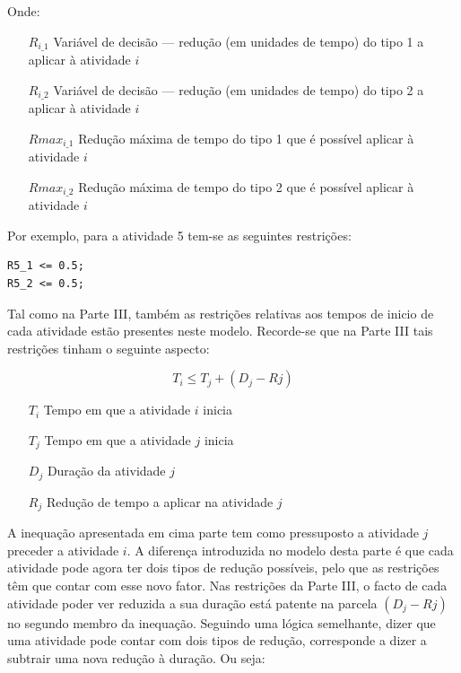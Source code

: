 Onde:

\begin{itemize}
	\item[$R_{i\_1}$] Variável de decisão --- redução (em unidades de tempo) do tipo 1 a aplicar à atividade $i$
	\item[$R_{i\_2}$] Variável de decisão --- redução (em unidades de tempo) do tipo 2 a aplicar à atividade $i$
	\item[$Rmax_{i\_1}$] Redução máxima de tempo do tipo 1 que é possível aplicar à atividade $i$
	\item[$Rmax_{i\_2}$] Redução máxima de tempo do tipo 2 que é possível aplicar à atividade $i$
\end{itemize}

Por exemplo, para a atividade 5 tem-se as seguintes restrições:

\begin{verbatim}
R5_1 <= 0.5;
R5_2 <= 0.5;
\end{verbatim}

Tal como na Parte III, também as restrições relativas aos tempos de inicio de cada atividade estão presentes neste modelo. Recorde-se que na Parte III tais restrições tinham o seguinte aspecto:

\begin{displaymath}
T_{i} \leq T_{j} + (D_{j} - R{j})
\end{displaymath}

\begin{itemize}
	\item[$T_{i}$] Tempo em que a atividade $i$ inicia
	\item[$T_{j}$] Tempo em que a atividade $j$ inicia
	\item[$D_{j}$] Duração da atividade $j$
	\item[$R_{j}$] Redução de tempo a aplicar na atividade $j$
\end{itemize}

A inequação apresentada em cima parte tem como pressuposto a atividade $j$ preceder a atividade $i$.
A diferença introduzida no modelo desta parte é que cada atividade pode agora ter dois tipos de redução possíveis, pelo que as restrições têm que contar com esse novo fator. Nas restrições da Parte III, o facto de cada atividade poder ver reduzida a sua duração está patente na parcela $(D_{j} - R{j})$ no segundo membro da inequação. Seguindo uma lógica semelhante, dizer que uma atividade pode contar com dois tipos de redução, corresponde a dizer a subtrair uma nova redução à duração. Ou seja:


